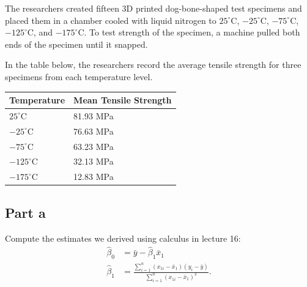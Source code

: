 \documentclass[
]{article}
\newcounter{none} %
\begin{document}
The researchers created fifteen 3D printed dog-bone-shaped test
specimens and placed them in a chamber cooled with liquid nitrogen to
\(25^\circ\text{C}\), \(-25^\circ\text{C}\), \(-75^\circ\text{C}\),
\(-125^\circ\text{C}\), and \(-175^\circ\text{C}\). To test strength of
the specimen, a machine pulled both ends of the specimen until it
snapped.

In the table below, the researchers record the average tensile strength
for three specimens from each temperature level.

{\def\LTcaptype{none} %
\begin{longtable}[]{@{}ll@{}}
\toprule\noalign{}
Temperature & Mean Tensile Strength \\
\midrule\noalign{}
\endhead
\bottomrule\noalign{}
\endlastfoot
\(25^\circ\text{C}\) & 81.93 MPa \\
\(-25^\circ\text{C}\) & 76.63 MPa \\
\(-75^\circ\text{C}\) & 63.23 MPa \\
\(-125^\circ\text{C}\) & 32.13 MPa \\
\(-175^\circ\text{C}\) & 12.83 MPa \\
\end{longtable}
}

\subsection{Part a}\label{part-a-1}

Compute the estimates we derived using calculus in lecture 16:
\begin{align*} 
\widehat{\beta}_0 &= \bar{y} - \widehat{\beta}_1 \bar{x}_1 \\ 
\widehat{\beta}_1 &= \frac{\sum_{i=1}^n (x_{1i} - \bar{x}_1)(y_i-\bar{y})}{\sum_{i=1}^n (x_{1i}-\bar{x}_1)^2}.
\end{align*}

\normalsize
\end{document}
